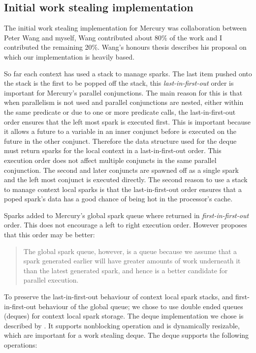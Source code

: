 \subsection{Initial work stealing implementation}

The initial work stealing implementation for Mercury was collaboration
between Peter Wang and myself, Wang contributed about 80\% of the work
and I contributed the remaining 20\%.
Wang's honours thesis \citep{wang-hons} describes his proposal on which
our implementation is heavily based.

So far each context has used a stack to manage sparks.
The last item pushed onto the stack is the first to be popped off the
stack,
this \emph{last-in-first-out} order is important for Mercury's parallel
conjunctions.
The main reason for this is that when parallelism is not used and
parallel conjunctions are nested,
either within the same predicate
or due to one or more predicate calls,
the last-in-first-out order ensures that the left most spark is executed
first.
This is important because it allows a future to \signal a variable in an
inner conjunct before \wait is executed on the future in the other
conjunct.
Therefore the data structure used for the deque must return sparks
for the local context in a last-in-first-out order.
This execution order does not affect multiple conjuncts in the same
parallel conjunction.
The second and later conjuncts are spawned off as a single spark
and the left most conjunct is executed directly.
The second reason to use a stack to manage context local sparks
is that the last-in-first-out order ensures that a poped spark's data
has a good chance of being hot in the processor's cache.

Sparks added to Mercury's global spark queue where 
returned in \emph{first-in-first-out} order.
This does not encourage a left to right execution order.
However \citet{wang_hons} proposes that this order may be better:

\begin{quote}
The global spark queue, however, is a queue because we assume that a
spark generated earlier will have greater amounts of work underneath it
than the latest generated spark, and hence is a better candidate for
parallel execution.
\end{quote}

To preserve the last-in-first-out behaviour of context local spark
stacks,
and first-in-first-out behaviour of the global queue;
we chose to use double ended queues (deques) for context local spark
storage.
The deque implementation we chose 
is described by
\citet{Chase_2005_wsdeque}.
It supports nonblocking operation and is dynamically resizable,
which are important for a work stealing deque.
The deque supports the following operations:

